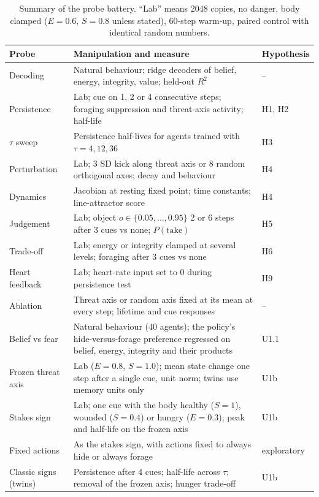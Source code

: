 \documentclass[11pt]{article}
\begin{document}
\begin{table}[h]
\centering\small
\caption{Summary of the probe battery. ``Lab'' means 2048 copies, no danger, body clamped ($E=0.6$, $S=0.8$ unless stated), 60-step warm-up, paired control with identical random numbers.}
\label{tab:protocols}
\begin{tabularx}{\linewidth}{@{}lXl@{}}
\toprule
Probe & Manipulation and measure & Hypothesis \\
\midrule
Decoding & Natural behaviour; ridge decoders of belief, energy, integrity, value; held-out $R^2$ & -- \\
Persistence & Lab; cue on 1, 2 or 4 consecutive steps; foraging suppression and threat-axis activity; half-life & H1, H2 \\
$\tau$ sweep & Persistence half-lives for agents trained with $\tau=4,12,36$ & H3 \\
Perturbation & Lab; 3 SD kick along threat axis or 8 random orthogonal axes; decay and behaviour & H4 \\
Dynamics & Jacobian at resting fixed point; time constants; line-attractor score & H4 \\
Judgement & Lab; object $o\in\{0.05,\dots,0.95\}$ 2 or 6 steps after 3 cues vs none; $P(\text{take})$ & H5 \\
Trade-off & Lab; energy or integrity clamped at several levels; foraging after 3 cues vs none & H6 \\
Heart feedback & Lab; heart-rate input set to 0 during persistence test & H9 \\
Ablation & Threat axis or random axis fixed at its mean at every step; lifetime and cue responses & -- \\
Belief vs fear & Natural behaviour (40 agents); the policy's hide-versus-forage preference regressed on belief, energy, integrity and their products & U1.1 \\
Frozen threat axis & Lab ($E=0.8$, $S=1.0$); mean state change one step after a single cue, unit norm; twins use memory units only & U1b \\
Stakes sign & Lab; one cue with the body healthy ($S=1$), wounded ($S=0.4$) or hungry ($E=0.3$); peak and half-life on the frozen axis & U1b \\
Fixed actions & As the stakes sign, with actions fixed to always hide or always forage & exploratory \\
Classic signs (twins) & Persistence after 4 cues; half-life across $\tau$; removal of the frozen axis; hunger trade-off & U1b \\

\end{tabularx}
\end{table}
\end{document}

